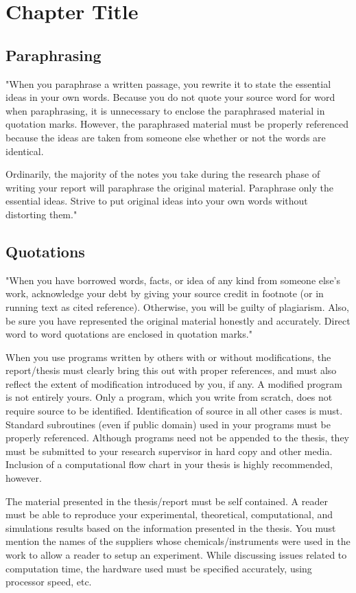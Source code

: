 \chapter{Chapter Title} \label{c3}
\section{Paraphrasing}
"When you paraphrase a written passage, you rewrite it to state the essential ideas in your own words. Because you do not quote your source word for word when paraphrasing, it is unnecessary to enclose the paraphrased material in quotation marks. However, the paraphrased material must be properly referenced because the ideas are taken from someone else whether or not the words are identical. 

Ordinarily, the majority of the notes you take during the research phase of writing your report will paraphrase the original material. Paraphrase only the essential ideas. Strive to put original ideas into your own words without distorting them."

\section{Quotations}
"When you have borrowed words, facts, or idea of any kind from someone else's work, acknowledge your debt by giving your source credit in footnote (or in running text as cited reference). Otherwise, you will be guilty of plagiarism. Also, be sure you have represented the original material honestly and accurately. Direct word to word quotations are enclosed in quotation marks."

When you use programs written by others with or without modifications, the report/thesis must clearly bring this out with proper references, and must also reflect the extent of modification introduced by you, if any. A modified program is not entirely yours. Only a program, which you write from scratch, does not require source to be identified. Identification of source in all other cases is must. Standard subroutines (even if public domain) used in your programs must be properly referenced. Although programs need not be appended to the thesis, they must be submitted to your research supervisor in hard copy and other media. Inclusion of a computational flow chart in your thesis is highly recommended, however. 

The material presented in the thesis/report must be self contained. A reader must be able to reproduce your experimental, theoretical, computational, and simulations results based on the information presented in the thesis. You must mention the names of the suppliers whose chemicals/instruments were used in the work to allow a reader to setup an experiment. While discussing issues related to computation time, the hardware used must be specified accurately, using processor speed, etc. 


